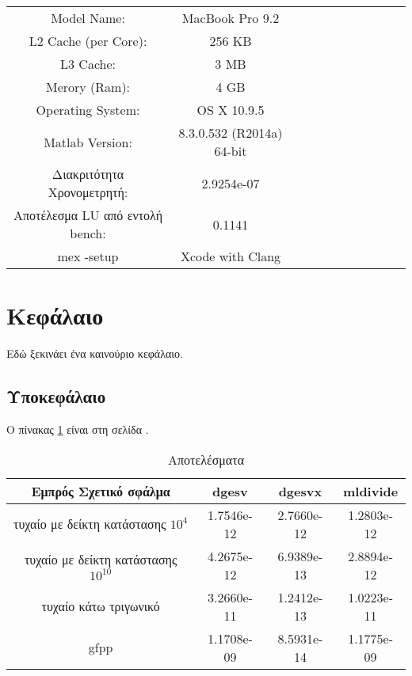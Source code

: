 \documentclass[a4paper,11pt]{article}
\begin{document}
	\begin{table}[h]
	\centering
		\begin{tabular}{| c | c | l l l l l l l l l}
		\hline
		Model Name: 						& 	MacBook Pro 9.2									\\
		L2 Cache (per Core):				&	256 KB											\\
		L3 Cache:							&	3 MB												\\
		Merory (Ram):						&	4 GB												\\
		Operating System:					&	OS X 10.9.5										\\
		Matlab Version:						&	8.3.0.532 (R2014a) 64-bit 								\\
		Διακριτότητα Χρονομετρητή:			&	2.9254e-07										\\
		Αποτέλεσμα LU από εντολή bench:	&	0.1141											\\
		mex -setup						&	Xcode with Clang									\\
		\hline
		\end{tabular}
	\end{table}

	
\pagebreak
\renewcommand\thesection{\arabic{section}}
\setcounter{section}{0}	%

\section{Κεφάλαιο} %
	Εδώ ξεκινάει ένα καινούριο κεφάλαιο.
	\subsection{Υποκεφάλαιο}			
				
		Ο πίνακας \ref{tab:label} είναι στη σελίδα \pageref{tab:label}.
		\begin{table}[htbp]
  			\centering
  			\begin{tabular}{@{} c | ccc @{}}
    				\hline
    				Εμπρός Σχετικό σφάλμα					& 		dgesv 		&	dgesvx		& 	mldivide 		\\ 
    				\hline
    				τυχαίο με δείκτη κατάστασης $10^4$ 		& 	 	1.7546e-12	&	2.7660e-12	&  	1.2803e-12	\\ 
    				τυχαίο με δείκτη κατάστασης $10^{10} $	& 		4.2675e-12	&	6.9389e-13	& 	2.8894e-12	\\ 
    				τυχαίο κάτω τριγωνικό 					& 		3.2660e-11	&	1.2412e-13	& 	1.0223e-11	\\ 
    				gfpp 									&		1.1708e-09	&	8.5931e-14	&	1.1775e-09	\\ 
    				\hline
  			\end{tabular}
  			\caption{Αποτελέσματα}
  			\label{tab:label}
		\end{table}
		
\end{document}
